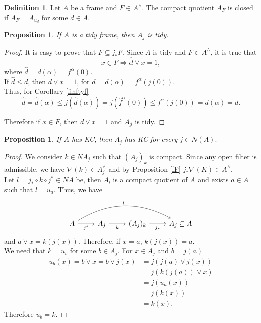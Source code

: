 \documentclass[11pt]{amsart}
\theoremstyle{plain}
\newtheorem{prop}[thm]{Proposition}
\theoremstyle{definition}
\newtheorem{dfn}[thm]{Definition}
\begin{document}
\begin{dfn}\label{ccquotien}
Let $A$ be a frame and $F\in A^\wedge$. The compact quotient $A_F$ is closed if $A_F=A_{u_d}$ for some $d\in A$.
\end{dfn}
\begin{prop}\label{tidyquout}
    If $A$ is a tidy frame, then $A_j$ is tidy.
\end{prop}

\begin{proof}
It is easy to prove that $F\subseteq j_*F$. Since $A$ is tidy and $F\in A^\wedge$, it is true that 
\[
x\in F\Rightarrow \hat{d}\vee x=1,
\]
where $\hat{d}=d(\alpha)=f^\alpha(0)$.\\
If $\hat{d}\leq d$, then $d\vee x=1$, for $d=d(\alpha)=f^\alpha(j(0))$.\\

Thus, for Corollary \ref{finftyf}
\[
\hat{d}=\hat{d}(\alpha)\leq j(\hat{d}(\alpha))=j(\hat{f}^\alpha(0))\leq f^\alpha(j(0))=d(\alpha)=d.
\]

Therefore if $x\in F$, then $d\vee x=1$ and $A_j$ is tidy.
\end{proof}

\begin{prop}\label{KCquout}
    If $A$ has KC, then $A_j$ has KC for every $j\in N(A).$
\end{prop}

\begin{proof}
We consider $k\in NA_j$ such that $(A_j)_k$ is compact. 
Since any open filter is admissible, we have $\nabla(k)\in A_j^\wedge$ 
and by Proposition \ref{fF} $j_*\nabla(K)\in A^\wedge$.\\

Let $l=j_*\circ  k\circ j^*\in NA$ be, then $A_l$ is a compact quotient of $A$ and exists $a\in A$ such that $l=u_a$. Thus, we have 
\[
\begin{tikzcd}
	A \arrow[r, "j^*"'] \arrow[rrr, "l", bend left] & A_j \arrow[r, "k"'] & (A_j)_k \arrow[r, "j_*"'] & A_j\subseteq A
	\end{tikzcd}\]
and $a\vee x=k(j(x))$. Therefore, if $x=a$, $k(j(x))=a$.\\

We need that $k=u_b$ for some $b\in A_j$. For $x\in A_j$ and $b=j(a)$
\[
\begin{split}
u_b(x)= b\vee x= b\vee j(x)& =j(j(a)\vee j(x))\\
& =j(k(j(a))\vee x)\\
& =j(u_a(x))\\
& =j(k(x))\\	
&=k(x).
\end{split}
\]
Therefore $u_b=k$.
\end{proof}
\end{document}
